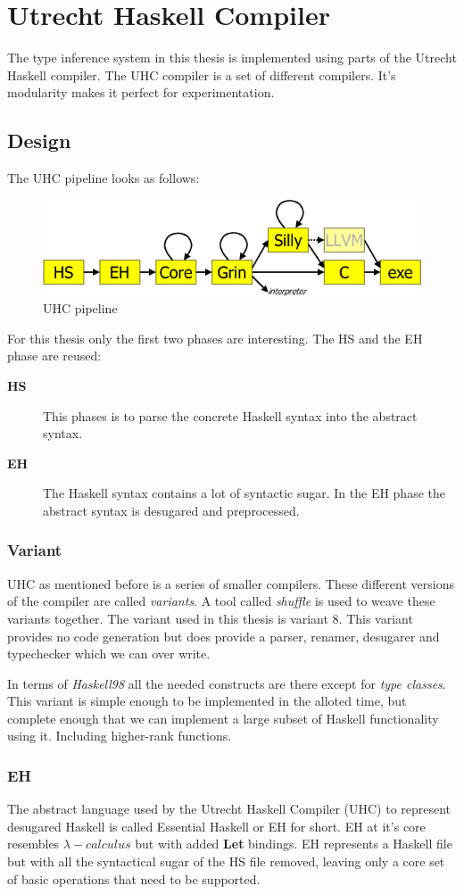 \chapter{Utrecht Haskell Compiler}
The type inference system in this thesis is implemented using parts of the Utrecht Haskell compiler. The UHC compiler is a set of different compilers. It's modularity makes it perfect for experimentation.
\section{Design}
The UHC pipeline looks as follows:
\begin{figure}[H]
\includegraphics[scale=0.8]{ehc-dataflow2}
\caption{UHC pipeline}
\label{flow}
\end{figure}

For this thesis only the first two phases are interesting. The HS and the EH phase are reused:
\begin{description}
\item[\textbf{HS}] This phases is to parse the concrete Haskell syntax into the abstract syntax. 
\item[\textbf{EH}] The Haskell syntax contains a lot of syntactic sugar. In the EH phase the abstract syntax is desugared and preprocessed.
\end{description}
\subsection{Variant}
UHC as mentioned before is a series of smaller compilers. These different versions of the compiler are called \emph{variants}. A tool called \emph{shuffle} is used to weave these variants together. The variant used in this thesis is variant 8. This variant provides no code generation but does provide a parser, renamer, desugarer and typechecker which we can over write.

In terms of \emph{Haskell98} all the needed constructs are there except for \emph{type classes}. This variant is simple enough to be implemented in the alloted time, but complete enough that we can implement a large subset of Haskell functionality using it. Including higher-rank functions.

\subsection{EH}
The abstract language used by the Utrecht Haskell Compiler (UHC) to represent desugared Haskell is called Essential Haskell or EH for short. EH at it's core resembles $\lambda-calculus$ but with added \textbf{Let} bindings. EH represents a Haskell file but with all the syntactical sugar of the HS file removed, leaving only a core set of basic operations that need to be supported.
